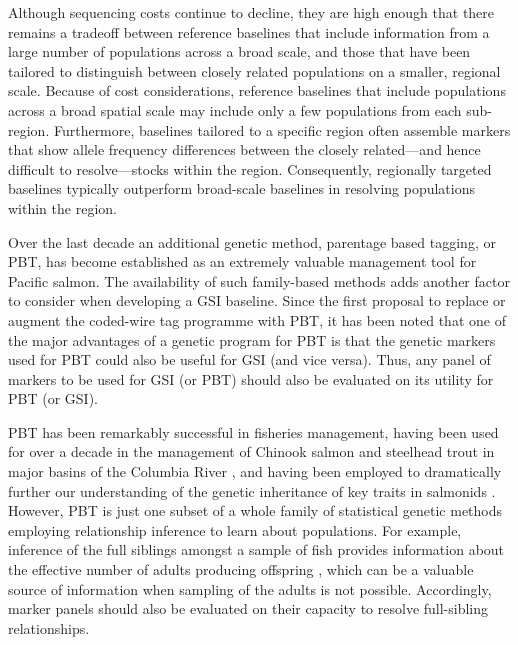 Although sequencing costs continue to decline, they are high enough
that there remains a tradeoff
between reference baselines that include information from a large number of
populations across a broad scale, and those that have been tailored
to distinguish between closely related populations on a smaller, regional scale.
Because of cost considerations, reference baselines that include populations across a broad
spatial scale may include only a few populations from each sub-region.  Furthermore,
baselines tailored to a specific region often assemble markers that
show allele frequency differences between the closely related---and hence difficult
to resolve---stocks within the region.  Consequently, regionally targeted baselines typically
outperform broad-scale baselines in resolving populations within the region.

Over the last decade an additional genetic method, parentage based tagging, or PBT,
\citep{anderson2005description,steele2019parentage}
has become established as an extremely valuable management
tool for Pacific salmon.  The availability of such family-based methods adds another factor to
consider when developing a GSI baseline.
Since the first proposal \citep{anderson2005description} to replace or augment the coded-wire tag
programme \citep{nandor2010overview}
with PBT, it has been noted that one of the major advantages of a genetic program for
PBT is that the genetic markers used for PBT could also be useful for GSI (and
vice versa).
Thus, any panel of markers to be used for GSI (or PBT) should also be evaluated on its
utility for PBT (or GSI).

PBT has been remarkably successful in fisheries
management, having been used for over a decade in the management of Chinook salmon
and steelhead trout in major basins of the Columbia River \citep{steele2019parentage,horn2023multigeneration}, and having been employed to dramatically further our
understanding of the genetic inheritance of key traits in salmonids
\citep{abadia2013large,beulke2023distinct}. However, PBT is just one subset of a whole
family of statistical genetic methods employing relationship inference to learn about
populations.  For example, inference of the full siblings amongst a sample of fish
provides information about the effective number of adults producing offspring
\citep{waples2011inbreeding,wang2023estimating}, which can
be a valuable source of information when sampling of the adults is not possible.
Accordingly, marker panels should also be evaluated on their
capacity to resolve full-sibling relationships.



